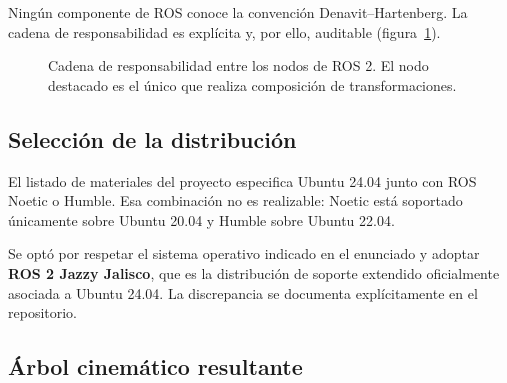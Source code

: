 \documentclass[11pt,a4paper]{article}
\newcommand{\mat}[1]{\mathbf{#1}}
\begin{document}
Ningún componente de ROS conoce la convención Denavit--Hartenberg. La
cadena de responsabilidad es explícita y, por ello, auditable
(figura~\ref{fig:nodos}).

\begin{figure}[h]
\centering
{}
\caption{Cadena de responsabilidad entre los nodos de ROS 2. El nodo
destacado es el único que realiza composición de transformaciones.}
\label{fig:nodos}
\end{figure}

\subsection{Selección de la distribución}

El listado de materiales del proyecto especifica Ubuntu 24.04 junto con
ROS Noetic o Humble. Esa combinación no es realizable: Noetic está
soportado únicamente sobre Ubuntu 20.04 y Humble sobre Ubuntu 22.04.

Se optó por respetar el sistema operativo indicado en el enunciado y
adoptar \textbf{ROS 2 Jazzy Jalisco}, que es la distribución de soporte
extendido oficialmente asociada a Ubuntu 24.04. La discrepancia se
documenta explícitamente en el repositorio.

\subsection{Árbol cinemático resultante}
\end{document}
